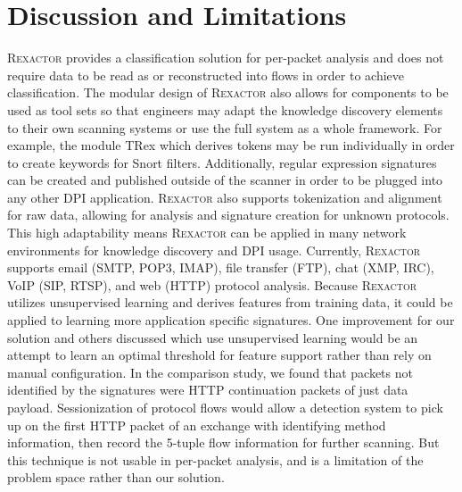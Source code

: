 \section{Discussion and Limitations}

\textsc{Rexactor} provides a classification solution for per-packet analysis and does not require data to be read as or reconstructed into flows in order to achieve classification. The modular design of \textsc{Rexactor} also allows for components to be used as tool sets so that engineers may adapt the knowledge discovery elements to their own scanning systems or use the full system as a whole framework. For example, the module TRex which derives tokens may be run individually in order to create keywords for Snort filters. Additionally, regular expression signatures can be created and published outside of the scanner in order to be plugged into any other DPI application. \textsc{Rexactor} also supports tokenization and alignment for raw data, allowing for analysis and signature creation for unknown protocols. This high adaptability means \textsc{Rexactor} can be applied in many network environments for knowledge discovery and DPI usage.
Currently, \textsc{Rexactor} supports email (SMTP, POP3, IMAP), file transfer (FTP), chat (XMP, IRC), VoIP (SIP, RTSP), and web (HTTP) protocol analysis. Because \textsc{Rexactor} utilizes unsupervised learning and derives features from training data, it could be applied to learning more application specific signatures. One improvement for our solution and others discussed which use unsupervised learning would be an attempt to learn an optimal threshold for feature support rather than rely on manual configuration. In the comparison study, we found that packets not identified by the signatures were HTTP continuation packets of just data payload. Sessionization of protocol flows would allow a detection system to pick up on the first HTTP packet of an exchange with identifying method information, then record the 5-tuple flow information for further scanning. But this technique is not usable in per-packet analysis, and is a limitation of the problem space rather than our solution.

